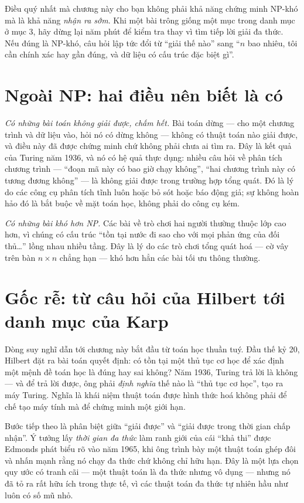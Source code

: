 \documentclass[../../algorithm.tex]{subfiles}
\begin{document}
\begin{cannho}
Điều quý nhất mà chương này cho bạn không phải khả năng chứng minh NP-khó mà là khả năng \emph{nhận ra sớm}. Khi một bài trông giống một mục trong danh mục ở mục 3, hãy dừng lại năm phút để kiểm tra thay vì tìm tiếp lời giải đa thức. Nếu đúng là NP-khó, câu hỏi lập tức đổi từ ``giải thế nào'' sang ``\(n\) bao nhiêu, tôi cần chính xác hay gần đúng, và dữ liệu có cấu trúc đặc biệt gì''.
\end{cannho}

\section{Ngoài NP: hai điều nên biết là có}

\emph{Có những bài toán không giải được, chấm hết.} Bài toán dừng --- cho một chương trình và dữ liệu vào, hỏi nó có dừng không --- không có thuật toán nào giải được, và điều này đã được chứng minh chứ không phải chưa ai tìm ra. Đây là kết quả của Turing năm 1936, và nó có hệ quả thực dụng: nhiều câu hỏi về phân tích chương trình --- ``đoạn mã này có bao giờ chạy không'', ``hai chương trình này có tương đương không'' --- là không giải được trong trường hợp tổng quát. Đó là lý do các công cụ phân tích tĩnh luôn hoặc bỏ sót hoặc báo động giả; sự không hoàn hảo đó là bắt buộc về mặt toán học, không phải do công cụ kém.

\emph{Có những bài khó hơn NP.} Các bài về trò chơi hai người thường thuộc lớp cao hơn, vì chúng có cấu trúc ``tồn tại nước đi sao cho với mọi phản ứng của đối thủ\dots'' lồng nhau nhiều tầng. Đây là lý do các trò chơi tổng quát hoá --- cờ vây trên bàn \(n\times n\) chẳng hạn --- khó hơn hẳn các bài tối ưu thông thường.

\section{Gốc rễ: từ câu hỏi của Hilbert tới danh mục của Karp}

Dòng suy nghĩ dẫn tới chương này bắt đầu từ toán học thuần tuý. Đầu thế kỷ 20, Hilbert đặt ra bài toán quyết định: có tồn tại một thủ tục cơ học để xác định một mệnh đề toán học là đúng hay sai không? Năm 1936, Turing trả lời là không --- và để trả lời được, ông phải \emph{định nghĩa} thế nào là ``thủ tục cơ học'', tạo ra máy Turing. Nghĩa là khái niệm thuật toán được hình thức hoá không phải để chế tạo máy tính mà để chứng minh một giới hạn.

Bước tiếp theo là phân biệt giữa ``giải được'' và ``giải được trong thời gian chấp nhận''. Ý tưởng lấy \emph{thời gian đa thức} làm ranh giới của cái ``khả thi'' được Edmonds phát biểu rõ vào năm 1965, khi ông trình bày một thuật toán ghép đôi và nhấn mạnh rằng nó chạy đa thức chứ không chỉ hữu hạn. Đây là một lựa chọn quy ước có tranh cãi --- một thuật toán  là đa thức nhưng vô dụng --- nhưng nó đã tỏ ra rất hữu ích trong thực tế, vì các thuật toán đa thức tự nhiên hầu như luôn có số mũ nhỏ.
\end{document}
